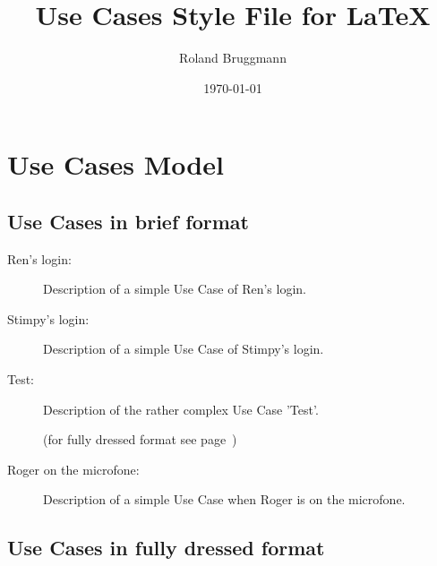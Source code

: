\documentclass[a4paper, 10pt, oneside, draft]{article}
\title{Use Cases Style File for \LaTeX}
\date{\today}
\author{Roland Bruggmann}
\begin{document}
\maketitle
\tableofcontents
% 
\newpage
% 
\section{Use Cases Model}
\label{sec:use_cases_model}
% 
\subsection{Use Cases in brief format}
\label{subsec:uc_in_brief_format}
% 
\begin{description}
  \item[Ren's login:] Description of a simple Use Case of Ren's login.

  \item[Stimpy's login:] Description of a simple Use Case of Stimpy's login.

  \item[Test:] Description of the rather complex Use Case 'Test'.

  (for fully dressed format see page~\pageref{uc:Test})

  \item[Roger on the microfone:] Description of a simple Use Case when Roger is on the microfone.
\end{description}
% 
\newpage
% 
\subsection{Use Cases in fully dressed format}
\label{subsec:uc_in_fully_dressed_format}
\end{document}
